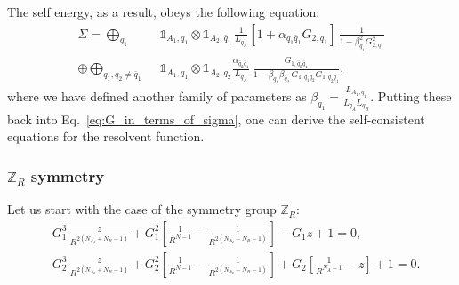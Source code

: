 \documentclass[aps,pra,reprint,superscriptaddress,twocolumn,notitlepage]{revtex4-1}
\numberwithin{equation}{section}
\begin{document}
\begin{widetext}
The self energy, as a result, obeys the following equation:
\begin{equation}\label{eq:self_energy_general}
\begin{aligned}
    \Sigma = \bigoplus_{q_1}\ \ \, &  \ \ \mathbb{1}_{A_1,q_1} \otimes \mathbb{1}_{A_2,\bar{q}_1}  \,   \frac{1}{L_{q_A}} \left[  1 + \alpha_{q_1 \bar{q}_1 } G_{2,q_1} \right] \, 
    \frac{1}{1 - \beta_{q_1}^2 G_{2,q_1}^2 }
    \\
     \oplus  \bigoplus_{q_1,q_2\neq \bar{q}_1} &  \ \ \mathbb{1}_{A_1,q_1} \otimes \mathbb{1}_{A_2,q_2} 
     \frac{\alpha_{\bar{q}_2\bar{q}_1}}{L_{q_A}} \, 
     \frac{G_{1, \bar{q}_2 \bar{q}_1 } }{1 - \beta_{q_1} \beta_{\bar{q}_2} \, G_{1,q_1 q_2} G_{1, \bar{q}_2 \bar{q}_1 } } ,
\end{aligned}    
\end{equation}
where we have defined another family of parameters as $\beta_{q_1} = \frac{ L_{A_1,q_1} }{ L_{q_A} L_{q_B} }$. Putting these back into Eq.~\eqref{eq:G_in_terms_of_sigma}, one can derive the self-consistent equations for the resolvent function.


\subsubsection{$\mathbb{Z}_R$ symmetry}

Let us start with the case of the symmetry group $\mathbb{Z}_R$:
\begin{equation}\label{eq:cubic_eq_ZR}
\begin{aligned}
    & G_1^3 \, \frac{z}{R^{2\left( N_{A_2}+N_B-1 \right)}} 
    + G_1^2 \left[ \frac{1}{R^{N-1}} - \frac{1}{R^{2\left( N_{A_2}+N_B-1  \right)}} \right]
    - G_1  z 
    + 1 = 0, \\
    & G_2^3 \, \frac{z}{R^{2\left( N_{A_2}+N_B-1 \right)}} 
    + G_2^2 \left[ \frac{1}{R^{N-1}} - \frac{1}{R^{2\left( N_{A_2}+N_B-1  \right)}} \right]
    + G_2 \left[ \frac{1}{R^{N_A-1}}  - z \right]
    + 1 = 0.
\end{aligned}    
\end{equation}

\end{widetext}
\end{document}
